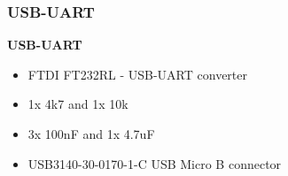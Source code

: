 
\subsubsection{USB-UART}

{\bf USB-UART}
\begin{itemize} \item FTDI FT232RL - USB-UART converter \item 1x 4k7 and 1x 10k
\item 3x 100nF and 1x 4.7uF \item USB3140-30-0170-1-C USB Micro B connector
\end{itemize}